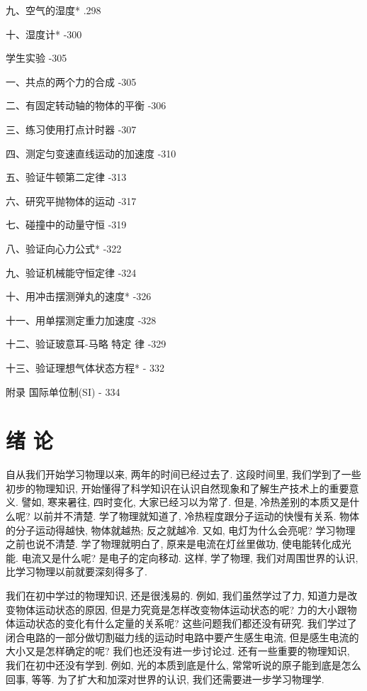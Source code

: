 \documentclass[10pt]{article}
\begin{document}
九、空气的湿度* .298

十、湿度计* -300

学生实验 -305

一、共点的两个力的合成 -305

二、有固定转动轴的物体的平衡 -306

三、练习使用打点计时器 -307

四、测定匀变速直线运动的加速度 -310

五、验证牛顿第二定律 -313

六、研究平抛物体的运动 -317

七、碰撞中的动量守恒 -319

八、验证向心力公式* -322

九、验证机械能守恒定律 -324

十、用冲击摆测弹丸的速度* -326

十一、用单摆测定重力加速度 -328

十二、验证玻意耳-马略 特定 律 -329

十三、验证理想气体状态方程* - 332

附录 国际单位制(SI) - 334

\section*{绪 论}

自从我们开始学习物理以来, 两年的时间已经过去了. 这段时间里, 我们学到了一些初步的物理知识, 开始懂得了科学知识在认识自然现象和了解生产技术上的重要意义. 譬如, 寒来暑往, 四时变化, 大家已经习以为常了. 但是, 冷热差别的本质又是什么呢? 以前并不清楚. 学了物理就知道了, 冷热程度跟分子运动的快慢有关系. 物体的分子运动得越快, 物体就越热; 反之就越冷. 又如, 电灯为什么会亮呢? 学习物理之前也说不清楚. 学了物理就明白了, 原来是电流在灯丝里做功, 使电能转化成光能. 电流又是什么呢? 是电子的定向移动. 这样, 学了物理, 我们对周围世界的认识, 比学习物理以前就要深刻得多了.

我们在初中学过的物理知识, 还是很浅易的. 例如, 我们虽然学过了力, 知道力是改变物体运动状态的原因, 但是力究竟是怎样改变物体运动状态的呢? 力的大小跟物体运动状态的变化有什么定量的关系呢? 这些问题我们都还没有研究. 我们学过了闭合电路的一部分做切割磁力线的运动时电路中要产生感生电流, 但是感生电流的大小又是怎样确定的呢? 我们也还没有进一步讨论过. 还有一些重要的物理知识, 我们在初中还没有学到. 例如, 光的本质到底是什么, 常常听说的原子能到底是怎么回事, 等等. 为了扩大和加深对世界的认识, 我们还需要进一步学习物理学.
\end{document}
